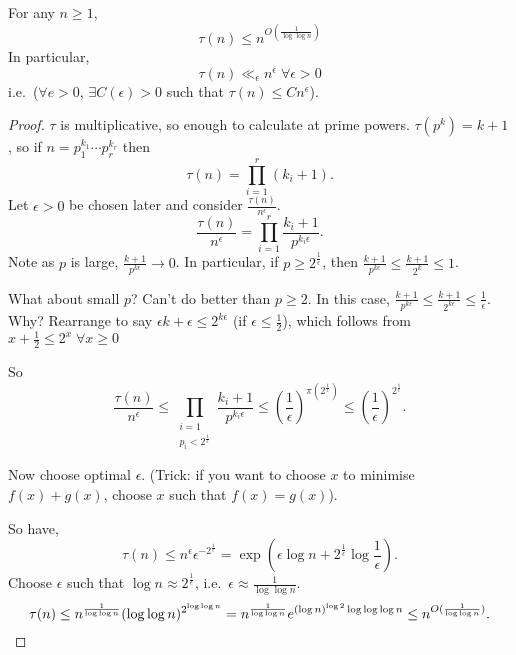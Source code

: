 \documentclass{article}
\begin{document}
\begin{nthm}\label{thm:5}
  For any $n \geq 1$,
  \begin{equation*}
    \tau(n) \leq n^{O\left(\frac{1}{\log \log n}\right)}
  \end{equation*}
  In particular,
  \begin{equation*}
    \tau(n) \ll_\epsilon n^\epsilon \; \forall \epsilon > 0
  \end{equation*}
  i.e.\ ($\forall e > 0$, $\exists C(\epsilon) > 0$ such that $\tau(n) \leq C n^\epsilon$).
\end{nthm}
\begin{proof}
  $\tau$ is multiplicative, so enough to calculate at prime powers. $\tau(p^k) = k+1$, so if $n = p_1^{k_1} \dotsm p_r^{k_r}$ then
  \begin{equation*}
    \tau(n) = \prod_{i=1}^r (k_i + 1).
  \end{equation*}
  Let $\epsilon > 0$ be chosen later and consider $\frac{\tau(n)}{n^\epsilon}$.
  \begin{equation*}
    \frac{\tau(n)}{n^\epsilon} = \prod_{i=1}^r \frac{k_i+1}{p^{k_i \epsilon}}.
  \end{equation*}
  Note as $p$ is large, $\frac{k+1}{p^{k\epsilon}} \to 0$. In particular, if $p \geq 2^{\frac{1}{\epsilon}}$, then $\frac{k+1}{p^{k\epsilon}} \leq \frac{k+1}{2^k} \leq 1$.

  What about small $p$? Can't do better than $p \geq 2$.
  In this case, $\frac{k+1}{p^{k\epsilon}} \leq \frac{k+1}{2^{k\epsilon}} \leq \frac{1}{\epsilon}$.
  Why? Rearrange to say $\epsilon k + \epsilon \leq 2^{k \epsilon}$ (if $\epsilon \leq \frac{1}{2}$), which follows from $x + \frac{1}{2} \leq 2^x \; \forall x \geq 0$

  So
  \begin{equation*}
    \frac{\tau(n)}{n^\epsilon} \leq \prod_{\substack{i=1 \\ p_i < 2^{\frac{1}{\epsilon}}}} \frac{k_i + 1}{p^{k_i \epsilon}} \leq \left(\frac{1}{\epsilon}\right)^{\pi(2^{\frac{1}{\epsilon}})} \leq \left(\frac{1}{\epsilon}\right)^{2^{\frac{1}{\epsilon}}}.
  \end{equation*}

  Now choose optimal $\epsilon$.
  (Trick: if you want to choose $x$ to minimise $f(x) + g(x)$, choose $x$ such that $f(x) = g(x)$).

  So have,
  \begin{equation*}
    \tau(n) \leq n^\epsilon \epsilon^{-2^{\frac{1}{\epsilon}}} = \exp\left(\epsilon \log n + 2^{\frac{1}{\epsilon}} \log \frac{1}{\epsilon}\right).
  \end{equation*}
  Choose $\epsilon$ such that $\log n \approx 2^{\frac{1}{\epsilon}}$, i.e.\ $\epsilon \approx \frac{1}{\log \log n}$.
  \begin{equation*}
    \tau(n) \leq n^{\frac{1}{\log \log n}} (\log \log n)^{2^{\log \log n}} = n^{\frac{1}{\log \log n}} e^{(\log n)^{\log 2} \log \log \log n} \leq n^{O(\frac{1}{\log \log n})}. \qedhere
  \end{equation*}
\end{proof}
\end{document}
